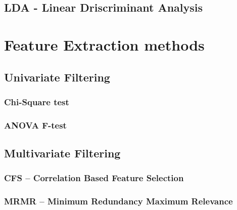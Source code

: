 \subsection{LDA - Linear Driscriminant Analysis} %
\label{sec:lda}

\section{Feature Extraction methods} %
\label{sec:feature_extraction}


\subsection{Univariate Filtering} %
\label{sec:inserting_tables}

\subsubsection{Chi-Square test} %
\label{sec:inserting_tables}

\subsubsection{ANOVA F-test} %
\label{sec:inserting_tables}

\subsection{Multivariate Filtering} %
\label{sec:inserting_tables}

\subsubsection{CFS – Correlation Based Feature Selection} %
\label{sec:inserting_tables}

\subsubsection{MRMR – Minimum Redundancy Maximum Relevance} %
\label{sec:inserting_tables}